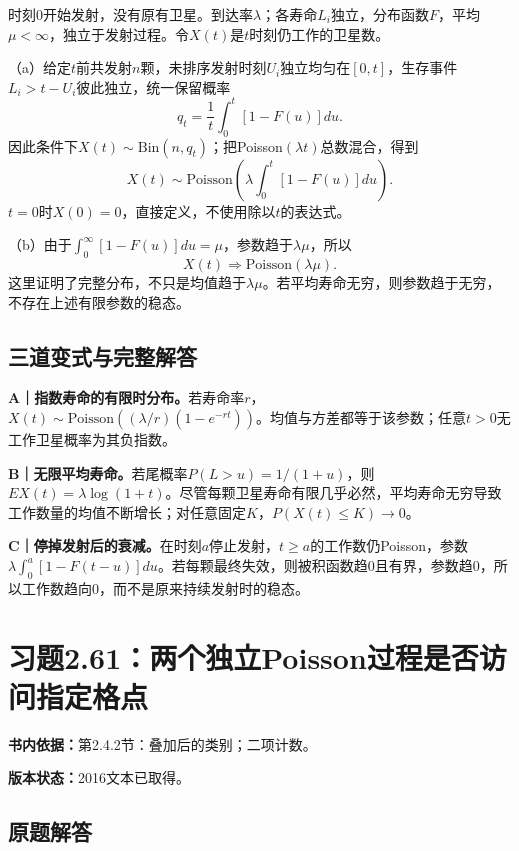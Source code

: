 \documentclass[
  11pt,
  a4paper,
  UTF8,fontset=fandol]{ctexart}
\let\OldSection\section
\renewcommand{\section}{\Needspace{7\baselineskip}\OldSection}
\let\OldSubsection\subsection
\renewcommand{\subsection}{\Needspace{5\baselineskip}\OldSubsection}
\begin{document}
时刻0开始发射，没有原有卫星。到达率\(\lambda\)；各寿命\(L_i\)独立，分布函数\(F\)，平均\(\mu<\infty\)，独立于发射过程。令\(X(t)\)是\(t\)时刻仍工作的卫星数。

（a）给定\(t\)前共发射\(n\)颗，未排序发射时刻\(U_i\)独立均匀在\([0,t]\)，生存事件\(L_i>t-U_i\)彼此独立，统一保留概率
\[q_t=\frac1t\int_0^t[1-F(u)]du.\]
因此条件下\(X(t)\sim\mathrm{Bin}(n,q_t)\)；把Poisson\((\lambda t)\)总数混合，得到
\[\boxed{X(t)\sim\mathrm{Poisson}\left(\lambda\int_0^t[1-F(u)]du\right)}.\]
\(t=0\)时\(X(0)=0\)，直接定义，不使用除以\(t\)的表达式。

（b）由于\(\int_0^\infty[1-F(u)]du=\mu\)，参数趋于\(\lambda\mu\)，所以
\[\boxed{X(t)\Longrightarrow\mathrm{Poisson}(\lambda\mu).}\]
这里证明了完整分布，不只是均值趋于\(\lambda\mu\)。若平均寿命无穷，则参数趋于无穷，不存在上述有限参数的稳态。

\subsection{三道变式与完整解答}\label{ux4e09ux9053ux53d8ux5f0fux4e0eux5b8cux6574ux89e3ux7b54-59}

\textbf{A｜指数寿命的有限时分布。}若寿命率\(r\)，\(X(t)\sim\mathrm{Poisson}((\lambda/r)(1-e^{-rt}))\)。均值与方差都等于该参数；任意\(t>0\)无工作卫星概率为其负指数。

\textbf{B｜无限平均寿命。}若尾概率\(P(L>u)=1/(1+u)\)，则\(EX(t)=\lambda\log(1+t)\)。尽管每颗卫星寿命有限几乎必然，平均寿命无穷导致工作数量的均值不断增长；对任意固定\(K\)，\(P(X(t)\le K)\to0\)。

\textbf{C｜停掉发射后的衰减。}在时刻\(a\)停止发射，\(t\ge a\)的工作数仍Poisson，参数\(\lambda\int_0^a[1-F(t-u)]du\)。若每颗最终失效，则被积函数趋0且有界，参数趋0，所以工作数趋向0，而不是原来持续发射时的稳态。

\newpage

\section{习题2.61：两个独立Poisson过程是否访问指定格点}\label{ux4e60ux98982.61ux4e24ux4e2aux72ecux7acbpoissonux8fc7ux7a0bux662fux5426ux8bbfux95eeux6307ux5b9aux683cux70b9}

\textbf{书内依据：}第2.4.2节：叠加后的类别；二项计数。

\textbf{版本状态：}2016文本已取得。

\subsection{原题解答}\label{ux539fux9898ux89e3ux7b54-60}
\end{document}
